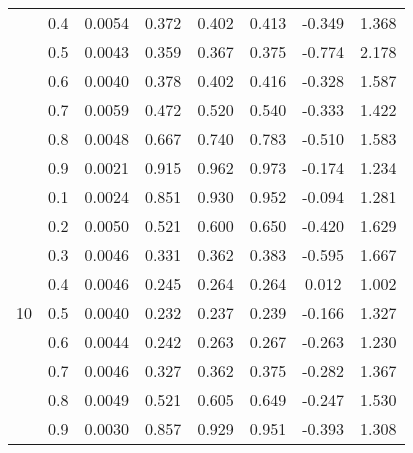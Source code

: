 \documentclass[11pt,a4paper]{report}
\begin{document}
\begin{longtable}{ | c | c || c | c | c | c | c | c | }
 & 0.4 & 0.0054 & 0.372 & 0.402 & 0.413 & -0.349 & 1.368 \\
 & 0.5 & 0.0043 & 0.359 & 0.367 & 0.375 & -0.774 & 2.178 \\
 & 0.6 & 0.0040 & 0.378 & 0.402 & 0.416 & -0.328 & 1.587 \\
 & 0.7 & 0.0059 & 0.472 & 0.520 & 0.540 & -0.333 & 1.422 \\
 & 0.8 & 0.0048 & 0.667 & 0.740 & 0.783 & -0.510 & 1.583 \\
 & 0.9 & 0.0021 & 0.915 & 0.962 & 0.973 & -0.174 & 1.234 \\
 \hline
\multirow{9}{*}{10} & 0.1 & 0.0024 & 0.851 & 0.930 & 0.952 & -0.094 & 1.281 \\
 & 0.2 & 0.0050 & 0.521 & 0.600 & 0.650 & -0.420 & 1.629 \\
 & 0.3 & 0.0046 & 0.331 & 0.362 & 0.383 & -0.595 & 1.667 \\
 & 0.4 & 0.0046 & 0.245 & 0.264 & 0.264 & 0.012 & 1.002 \\
 & 0.5 & 0.0040 & 0.232 & 0.237 & 0.239 & -0.166 & 1.327 \\
 & 0.6 & 0.0044 & 0.242 & 0.263 & 0.267 & -0.263 & 1.230 \\
 & 0.7 & 0.0046 & 0.327 & 0.362 & 0.375 & -0.282 & 1.367 \\
 & 0.8 & 0.0049 & 0.521 & 0.605 & 0.649 & -0.247 & 1.530 \\
 & 0.9 & 0.0030 & 0.857 & 0.929 & 0.951 & -0.393 & 1.308 \\
 \hline
\hline
\end{longtable}
\end{document}
